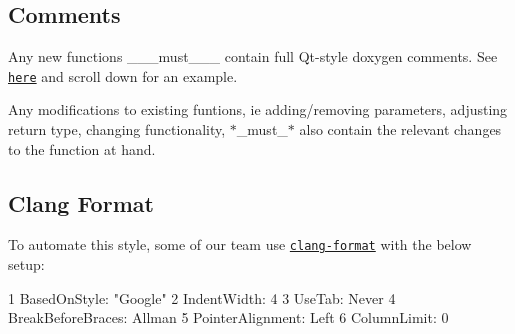 \subsection*{Comments}


\begin{DoxyItemize}
\item Any new functions \+\_\+\+\_\+\+\_\+must\+\_\+\+\_\+\+\_\+ contain full Qt-\/style doxygen comments. See \href{http://www.stack.nl/~dimitri/doxygen/manual/docblocks.html#cppblock}{\tt here} and scroll down for an example.
\item Any modifications to existing funtions, ie adding/removing parameters, adjusting return type, changing functionality, $\ast$\+\_\+must\+\_\+$\ast$ also contain the relevant changes to the function at hand.
\end{DoxyItemize}

\subsection*{Clang Format}

To automate this style, some of our team use \href{http://clang.llvm.org/docs/ClangFormat.html}{\tt clang-\/format} with the below setup\+: 
\begin{DoxyCode}
1 BasedOnStyle: "Google"  
2 IndentWidth: 4
3 UseTab: Never   
4 BreakBeforeBraces: Allman  
5 PointerAlignment: Left
6 ColumnLimit: 0
\end{DoxyCode}
 